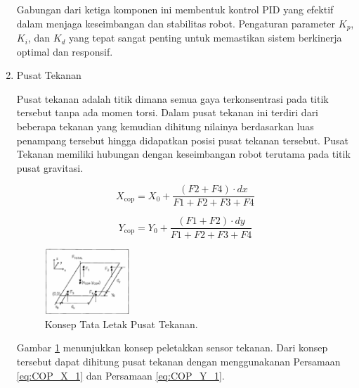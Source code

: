 \begin{enumerate}[label=\Alph*.]
    \hspace*{1em} Gabungan dari ketiga komponen ini membentuk kontrol PID yang efektif dalam menjaga keseimbangan dan stabilitas robot. Pengaturan parameter $K_p$, $K_i$, dan $K_d$ yang tepat sangat penting untuk memastikan sistem berkinerja optimal dan responsif.

    \item Pusat Tekanan
    \label{subsec:pusattekanan}

    \hspace*{1em} Pusat tekanan adalah titik dimana semua gaya terkonsentrasi pada titik tersebut tanpa ada momen torsi\cite{hawley2016external}. Dalam pusat tekanan ini terdiri dari beberapa tekanan yang kemudian dihitung nilainya berdasarkan luas penampang tersebut hingga didapatkan posisi pusat tekanan tersebut. Pusat Tekanan memiliki hubungan dengan keseimbangan robot terutama pada titik pusat gravitasi\cite{arifin2017implementasi}.

    \begin{equation}
      X_{\mathrm{cop}} = X_0 + \frac{(F2 + F4) \cdot dx}{F1 + F2 + F3 + F4}
      \label{eq:COP_X_1}
    \end{equation}

    \begin{equation}
      Y_{\mathrm{cop}} = Y_0 + \frac{(F1 + F2) \cdot dy}{F1 + F2 + F3 + F4}
      \label{eq:COP_Y_1}
    \end{equation}


    \begin{figure} [h] \centering
      \includegraphics[width=0.3\textwidth]{gambar/Konsep_Letak.png}
      \caption{Konsep Tata Letak Pusat Tekanan\cite{resna2005}.}
      \label{fig:Konsep_Letak}
    \end{figure}

    \hspace*{1em} Gambar \ref{fig:Konsep_Letak} menunjukkan konsep peletakkan sensor tekanan. Dari konsep tersebut dapat dihitung pusat tekanan dengan menggunakanan Persamaan \ref{eq:COP_X_1} dan Persamaan \ref{eq:COP_Y_1}.
\end{enumerate}